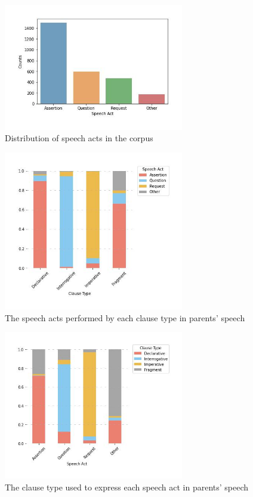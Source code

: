 \begin{figure}[H]
    \centering
    \includegraphics[width=0.7\textwidth]{figures/man-real-sp.jpg}
    \caption{Distribution of speech acts in the corpus}
    \label{fig:man-real-sp}
\end{figure}

\begin{figure}[H]
    \centering
    \includegraphics[width=0.7\textwidth]{figures/man-real-clsp.jpg}
    \caption{The speech acts performed by each clause type in parents' speech}
    \label{fig:man-real-clsp}
\end{figure}

\begin{figure}[H]
    \centering
    \includegraphics[width=0.7\textwidth]{figures/man-real-spcl.jpg}
    \caption{The clause type used to express each speech act in parents' speech}
    \label{fig:man-real-spcl}
\end{figure}

